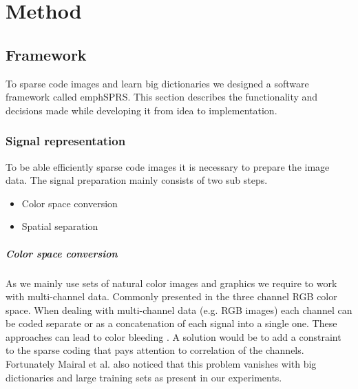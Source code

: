 \chapter{Method}

\section{Framework}
To sparse code images and learn big dictionaries we designed a software
framework called emph{SPRS}. This section describes the functionality and
decisions made while developing it from idea to implementation.

\subsection{Signal representation}
\label{sec:signal_representation}
To be able efficiently sparse code images it is necessary to prepare the
image data. The signal preparation mainly consists of two sub steps.
\begin{itemize}
 \item Color space conversion
 \item Spatial separation
\end{itemize}

\paragraph{Color space conversion} As we mainly use sets of natural color images
and graphics we require to work with multi-channel data. Commonly presented in
the three channel RGB color space.
When dealing with multi-channel data (e.g. RGB images) each channel can be coded
separate or as a concatenation of each signal into a single one. These
approaches can lead to color bleeding \cite{mairal08sparse}. 
A solution would be to add a constraint to the sparse coding that pays
attention to correlation of the channels.  
Fortunately Mairal et al. also noticed that this problem vanishes with big
dictionaries and large training sets as present in our experiments.
\cite{mairal08sparse}


